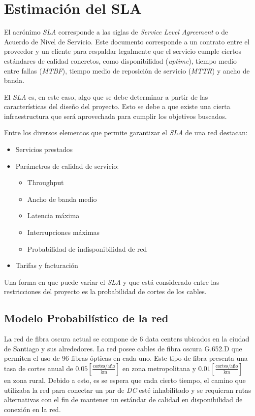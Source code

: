 \section{Estimación del SLA}
\label{sec:SLA}

El acrónimo \emph{SLA} corresponde a las siglas de \emph{Service Level
Agreement} o de Acuerdo de Nivel de Servicio. Este documento corresponde 
a un contrato entre el proveedor y un cliente para respaldar legalmente 
que el servicio cumple ciertos estándares de calidad concretos, como 
disponibilidad (\emph{uptime}), tiempo medio entre fallas (\emph{MTBF}),
tiempo medio de reposición de servicio (\emph{MTTR}) y ancho de banda.

El \emph{SLA} es, en este caso, algo que se debe determinar a partir de 
las características del diseño del proyecto. Esto se debe a que existe 
una cierta infraestructura que será aprovechada para cumplir los 
objetivos buscados.

Entre los diversos elementos que permite garantizar el \emph{SLA} de
una red destacan:
\begin{itemize}
\item Servicios prestados
\item Parámetros de calidad de servicio:
  \begin{itemize}
  \item Throughput
  \item Ancho de banda medio
  \item Latencia máxima
  \item Interrupciones máximas
  \item Probabilidad de indisponibilidad de red
  \end{itemize}
\item Tarifas y facturación
\end{itemize}

Una forma en que puede variar el \emph{SLA} y que está considerado
entre las restricciones del proyecto es la probabilidad de cortes de
los cables.

\subsection{Modelo Probabilístico de la red}

La red de fibra oscura actual se compone de 6 data centers ubicados en
la ciudad de Santiago y sus alrededores. La red posee cables de fibra
oscura G.652.D que permiten el uso de 96 fibras ópticas en cada
uno. Este tipo de fibra presenta una tasa de cortes anual de $0.05
[\frac{\text{cortes}/\text{año}}{\text{km}}]$ en zona metropolitana y
$0.01 [\frac{\text{cortes}/\text{año}}{\text{km}}]$ en zona rural.
Debido a esto, es se espera que cada cierto tiempo, el camino que
utilizaba la red para conectar un par de \emph{DC} esté inhabilitado y
se requieran rutas alternativas con el fin de mantener un estándar de
calidad en disponibilidad de conexión en la red.

